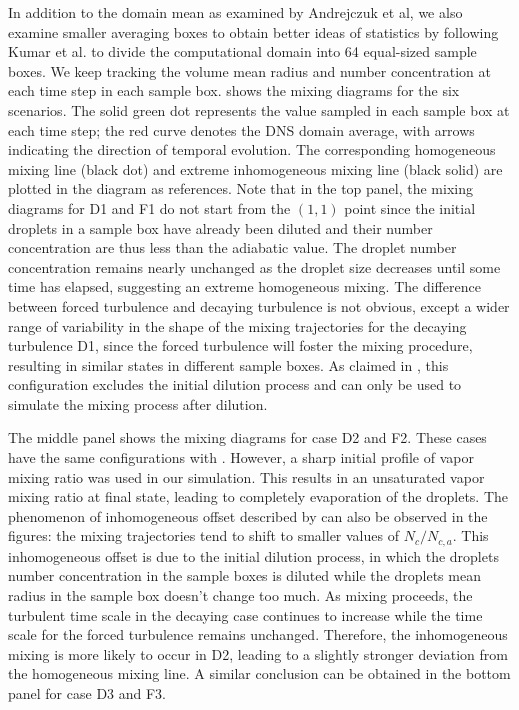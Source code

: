 \documentclass[draft,jgrga]{AGUTeX}
\begin{document}
\begin{article}
In addition to the domain mean as examined by Andrejczuk et al, we also examine smaller averaging boxes to obtain better ideas of statistics by following Kumar et al. \cite{Kumar14} to divide the computational domain into 64 equal-sized sample boxes. We keep tracking the volume mean radius and number concentration at each time step in each sample box.  shows the mixing diagrams for the six scenarios. The solid green dot represents the value sampled in each sample box at each time step; the red curve denotes the DNS domain average, with arrows indicating the direction of temporal evolution. The corresponding homogeneous mixing line (black dot) and extreme inhomogeneous mixing line (black solid) are plotted in the diagram as references. Note that in the top panel, the mixing diagrams for D1 and F1 do not start from the $(1,1)$ point since the initial droplets in a sample box have already been diluted and their number concentration are thus less than the adiabatic value. The droplet number concentration remains nearly unchanged as the droplet size decreases until some time has elapsed, suggesting an extreme homogeneous mixing.  The difference between forced turbulence and decaying turbulence is not obvious, except a wider range of variability in the shape of the mixing trajectories for the decaying turbulence D1, since the forced turbulence will foster the mixing procedure, resulting in similar states in different sample boxes. As claimed in \cite{And04}, this configuration excludes the initial dilution process and can only be used to simulate the mixing process after dilution.

The middle panel shows the mixing diagrams for case D2 and F2. These cases have the same configurations with \cite{Kumar14}. However, a sharp initial profile of vapor mixing ratio was used in our simulation. This results in an unsaturated vapor mixing ratio at final state, leading to completely evaporation of the droplets. The phenomenon of inhomogeneous offset described by \cite{Kumar14} can also be observed in the figures: the mixing trajectories tend to shift to smaller values of $N_c/N_{c,a}$. This inhomogeneous offset is due to the initial dilution process, in which the droplets number concentration in the sample boxes is diluted while the droplets mean radius in the sample box doesn't change too much. As mixing proceeds, the turbulent time scale in the decaying case continues to increase while the time scale for the forced turbulence remains unchanged. Therefore, the inhomogeneous mixing is more likely to occur in D2, leading to a slightly stronger deviation from the homogeneous mixing line.  A similar conclusion can be obtained in the bottom panel for case D3 and F3. 


\end{article}
\end{document}
